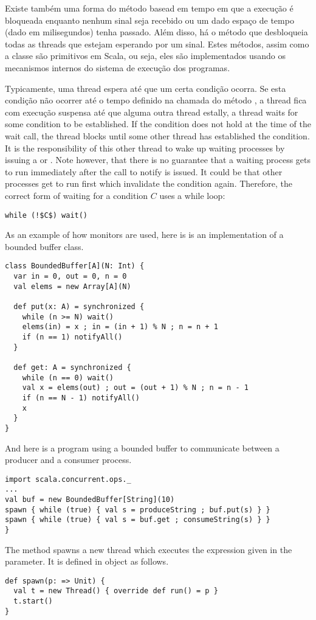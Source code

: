 Existe também uma forma do método  basead em tempo em que a
execução é bloqueada enquanto nenhum sinal seja recebido ou um dado espaço de tempo (dado em
milisegundos) tenha passado. Além disso, há o método  que desbloqueia todas
as threads que estejam esperando por um sinal. Estes métodos, assim como a classe  
são primitivos em Scala, ou seja, eles são implementados usando os mecanismos internos do sistema de execução
dos programas.

Typicamente, uma thread espera até que um certa condição ocorra. 
Se esta condição não ocorrer até o tempo definido na chamada do método , 
a thread fica com execução suspensa até que alguma outra thread 
estally, a thread waits for some condition to be established. If the
condition does not hold at the time of the wait call, the thread
blocks until some other thread has established the condition. It is
the responsibility of this other thread to wake up waiting processes
by issuing a  or . Note however, that
there is no guarantee that a waiting process gets to run immediately
after the call to notify is issued. It could be that other processes
get to run first which invalidate the condition again. Therefore, the
correct form of waiting for a condition $C$ uses a while loop:
\begin{lstlisting}
while (!$C$) wait()
\end{lstlisting}

As an example of how monitors are used, here is is an implementation
of a bounded buffer class.
\begin{lstlisting}
class BoundedBuffer[A](N: Int) {
  var in = 0, out = 0, n = 0
  val elems = new Array[A](N)

  def put(x: A) = synchronized {
    while (n >= N) wait()
    elems(in) = x ; in = (in + 1) % N ; n = n + 1
    if (n == 1) notifyAll()
  }

  def get: A = synchronized {
    while (n == 0) wait()
    val x = elems(out) ; out = (out + 1) % N ; n = n - 1
    if (n == N - 1) notifyAll()
    x
  }
}
\end{lstlisting}
And here is a program using a bounded buffer to communicate between a
producer and a consumer process.
\begin{lstlisting}
import scala.concurrent.ops._
...
val buf = new BoundedBuffer[String](10)
spawn { while (true) { val s = produceString ; buf.put(s) } }
spawn { while (true) { val s = buf.get ; consumeString(s) } }
}
\end{lstlisting}
The  method spawns a new thread which executes the
expression given in the parameter. It is defined in object 
as follows.
\begin{lstlisting}
def spawn(p: => Unit) {
  val t = new Thread() { override def run() = p }
  t.start()
}
\end{lstlisting}

